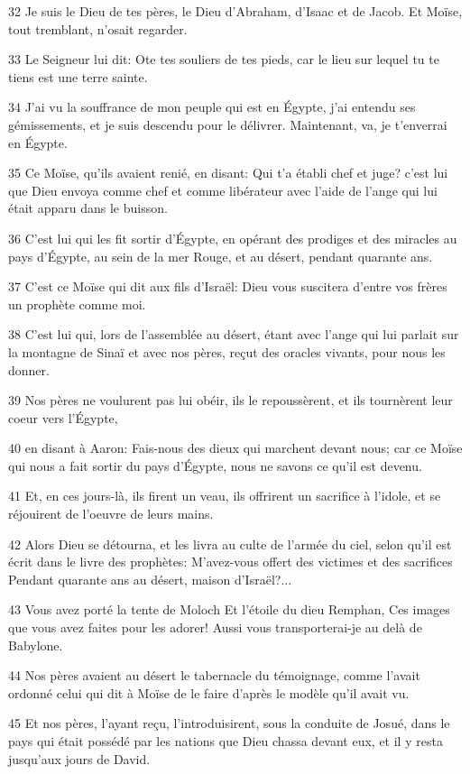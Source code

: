 \par 32 Je suis le Dieu de tes pères, le Dieu d'Abraham, d'Isaac et de Jacob. Et Moïse, tout tremblant, n'osait regarder.
\par 33 Le Seigneur lui dit: Ote tes souliers de tes pieds, car le lieu sur lequel tu te tiens est une terre sainte.
\par 34 J'ai vu la souffrance de mon peuple qui est en Égypte, j'ai entendu ses gémissements, et je suis descendu pour le délivrer. Maintenant, va, je t'enverrai en Égypte.
\par 35 Ce Moïse, qu'ils avaient renié, en disant: Qui t'a établi chef et juge? c'est lui que Dieu envoya comme chef et comme libérateur avec l'aide de l'ange qui lui était apparu dans le buisson.
\par 36 C'est lui qui les fit sortir d'Égypte, en opérant des prodiges et des miracles au pays d'Égypte, au sein de la mer Rouge, et au désert, pendant quarante ans.
\par 37 C'est ce Moïse qui dit aux fils d'Israël: Dieu vous suscitera d'entre vos frères un prophète comme moi.
\par 38 C'est lui qui, lors de l'assemblée au désert, étant avec l'ange qui lui parlait sur la montagne de Sinaï et avec nos pères, reçut des oracles vivants, pour nous les donner.
\par 39 Nos pères ne voulurent pas lui obéir, ils le repoussèrent, et ils tournèrent leur coeur vers l'Égypte,
\par 40 en disant à Aaron: Fais-nous des dieux qui marchent devant nous; car ce Moïse qui nous a fait sortir du pays d'Égypte, nous ne savons ce qu'il est devenu.
\par 41 Et, en ces jours-là, ils firent un veau, ils offrirent un sacrifice à l'idole, et se réjouirent de l'oeuvre de leurs mains.
\par 42 Alors Dieu se détourna, et les livra au culte de l'armée du ciel, selon qu'il est écrit dans le livre des prophètes: M'avez-vous offert des victimes et des sacrifices Pendant quarante ans au désert, maison d'Israël?...
\par 43 Vous avez porté la tente de Moloch Et l'étoile du dieu Remphan, Ces images que vous avez faites pour les adorer! Aussi vous transporterai-je au delà de Babylone.
\par 44 Nos pères avaient au désert le tabernacle du témoignage, comme l'avait ordonné celui qui dit à Moïse de le faire d'après le modèle qu'il avait vu.
\par 45 Et nos pères, l'ayant reçu, l'introduisirent, sous la conduite de Josué, dans le pays qui était possédé par les nations que Dieu chassa devant eux, et il y resta jusqu'aux jours de David.
